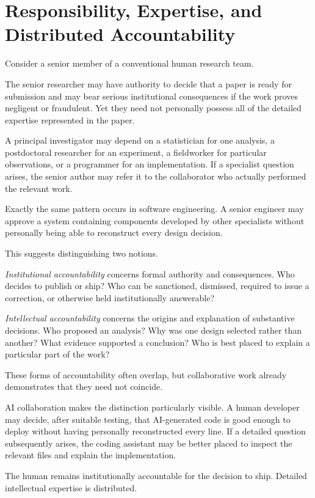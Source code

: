 \section{Responsibility, Expertise, and Distributed Accountability}

Consider a senior member of a conventional human research team.

The senior researcher may have authority to decide that a paper is ready for submission and may bear serious institutional consequences if the work proves negligent or fraudulent. Yet they need not personally possess all of the detailed expertise represented in the paper.

A principal investigator may depend on a statistician for one analysis, a postdoctoral researcher for an experiment, a fieldworker for particular observations, or a programmer for an implementation. If a specialist question arises, the senior author may refer it to the collaborator who actually performed the relevant work.

Exactly the same pattern occurs in software engineering. A senior engineer may approve a system containing components developed by other specialists without personally being able to reconstruct every design decision.

This suggests distinguishing two notions.

\emph{Institutional accountability} concerns formal authority and consequences. Who decides to publish or ship? Who can be sanctioned, dismissed, required to issue a correction, or otherwise held institutionally answerable?

\emph{Intellectual accountability} concerns the origins and explanation of substantive decisions. Who proposed an analysis? Why was one design selected rather than another? What evidence supported a conclusion? Who is best placed to explain a particular part of the work?

These forms of accountability often overlap, but collaborative work already demonstrates that they need not coincide.

AI collaboration makes the distinction particularly visible. A human developer may decide, after suitable testing, that AI-generated code is good enough to deploy without having personally reconstructed every line. If a detailed question subsequently arises, the coding assistant may be better placed to inspect the relevant files and explain the implementation.

The human remains institutionally accountable for the decision to ship. Detailed intellectual expertise is distributed.

